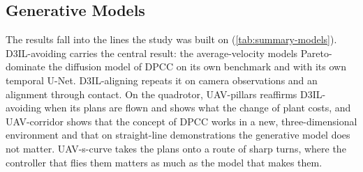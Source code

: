 
\subsection{Generative Models}\label{sec:res:summary:models}

The results fall into the lines the study was built on (\autoref{tab:summary-models}). D3IL-avoiding carries
the central result: the average-velocity models Pareto-dominate the diffusion model of \ac{DPCC} on its own
benchmark and with its own temporal U-Net. D3IL-aligning repeats it on camera observations and an alignment
through contact. On the quadrotor, UAV-pillars reaffirms D3IL-avoiding when its plans are flown and shows
what the change of plant costs, and UAV-corridor shows that the concept of \ac{DPCC} works in a new,
three-dimensional environment and that on straight-line demonstrations the generative model does not matter.
UAV-s-curve takes the plans onto a route of sharp turns, where the controller that flies them matters as much as
the model that makes them.

